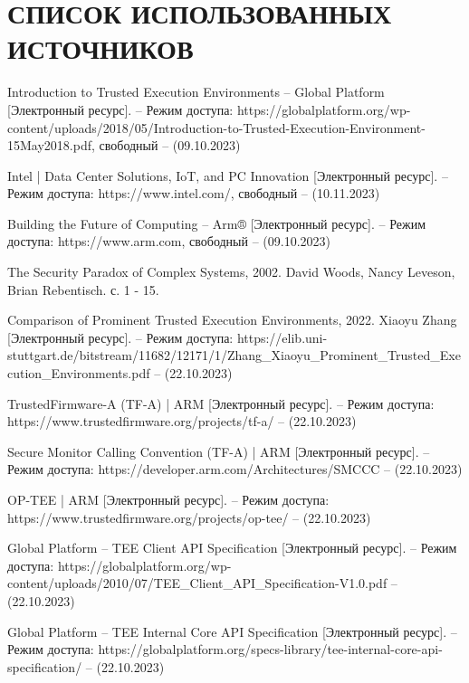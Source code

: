 \section*{СПИСОК ИСПОЛЬЗОВАННЫХ ИСТОЧНИКОВ}

\begingroup
\renewcommand{\section}[2]{}
\begin{thebibliography}{}
Introduction to Trusted Execution Environments -- Global Platform [Электронный ресурс]. – Режим доступа: https://globalplatform.org/wp-content/uploads/2018/05/Introduction-to-Trusted-Execution-Environment-15May2018.pdf, свободный – (09.10.2023)

Intel | Data Center Solutions, IoT, and PC Innovation [Электронный ресурс]. – Режим доступа: https://www.intel.com/, свободный – (10.11.2023)

Building the Future of Computing – Arm® [Электронный ресурс]. – Режим доступа: https://www.arm.com, свободный – (09.10.2023)

The Security Paradox of Complex Systems, 2002. David Woods, Nancy Leveson, Brian Rebentisch. с. 1 - 15.

Comparison of Prominent Trusted Execution Environments, 2022. Xiaoyu Zhang [Электронный ресурс]. – Режим доступа: https://elib.uni-stuttgart.de/bitstream/11682/12171/1/Zhang\_Xiaoyu\_Prominent\_Trusted\_Execution\_Environments.pdf – (22.10.2023)

TrustedFirmware-A (TF-A) | ARM [Электронный ресурс]. – Режим доступа: https://www.trustedfirmware.org/projects/tf-a/ – (22.10.2023)

Secure Monitor Calling Convention (TF-A) | ARM [Электронный ресурс]. – Режим доступа: https://developer.arm.com/Architectures/SMCCC – (22.10.2023)

OP-TEE | ARM [Электронный ресурс]. – Режим доступа: https://www.trustedfirmware.org/projects/op-tee/ – (22.10.2023)

Global Platform -- TEE Client API Specification [Электронный ресурс]. – Режим доступа: https://globalplatform.org/wp-content/uploads/2010/07/TEE\_Client\_API\_Specification-V1.0.pdf – (22.10.2023)

Global Platform -- TEE Internal Core API Specification [Электронный ресурс]. – Режим доступа: https://globalplatform.org/specs-library/tee-internal-core-api-specification/ – (22.10.2023)


\end{thebibliography}

